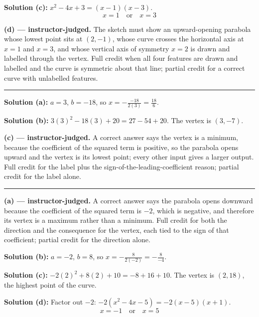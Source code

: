 \documentclass[12pt]{article}
\begin{document}
\textbf{Solution (c):} $x^2 - 4x + 3 = (x - 1)(x - 3)$.
\[ \boxed{x = 1 \quad \text{or} \quad x = 3} \]

\textbf{(d) --- instructor-judged.} The sketch must show an upward-opening parabola whose lowest point sits at $(2, -1)$, whose curve crosses the horizontal axis at $x = 1$ and $x = 3$, and whose vertical axis of symmetry $x = 2$ is drawn and labelled through the vertex. Full credit when all four features are drawn and labelled and the curve is symmetric about that line; partial credit for a correct curve with unlabelled features.

\vspace{0.2cm}\noindent\rule{\linewidth}{0.2pt}


\textbf{Solution (a):} $a = 3$, $b = -18$, so $x = -\frac{-18}{2(3)} = \frac{18}{6}$. 

\textbf{Solution (b):} $3(3)^2 - 18(3) + 20 = 27 - 54 + 20$. The vertex is $(3, -7)$. 

\textbf{(c) --- instructor-judged.} A correct answer says the vertex is a minimum, because the coefficient of the squared term is positive, so the parabola opens upward and the vertex is its lowest point; every other input gives a larger output. Full credit for the label plus the sign-of-the-leading-coefficient reason; partial credit for the label alone.

\vspace{0.2cm}\noindent\rule{\linewidth}{0.2pt}


\textbf{(a) --- instructor-judged.} A correct answer says the parabola opens downward because the coefficient of the squared term is $-2$, which is negative, and therefore its vertex is a maximum rather than a minimum. Full credit for both the direction and the consequence for the vertex, each tied to the sign of that coefficient; partial credit for the direction alone.

\textbf{Solution (b):} $a = -2$, $b = 8$, so $x = -\frac{8}{2(-2)} = -\frac{8}{-4}$. 

\textbf{Solution (c):} $-2(2)^2 + 8(2) + 10 = -8 + 16 + 10$. The vertex is $(2, 18)$, the highest point of the curve. 

\textbf{Solution (d):} Factor out $-2$: $-2(x^2 - 4x - 5) = -2(x - 5)(x + 1)$.
\[ \boxed{x = -1 \quad \text{or} \quad x = 5} \]
\end{document}
